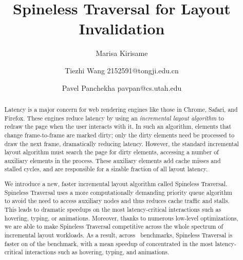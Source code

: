 \documentclass[acmsmall, anonymous, review, screen]{acmart}
\begin{document}
\title[Spineless]{Spineless Traversal for Layout Invalidation}  
\author{Marisa Kirisame}
\author{Tiezhi Wang {2152591@tongji.edu.cn}}
\author{Pavel Panchekha {pavpan@cs.utah.edu}}

\begin{abstract}
Latency is a major concern for web rendering engines
  like those in Chrome, Safari, and Firefox.
These engines reduce latency by using
  an \emph{incremental layout algorithm}
  to redraw the page when
  the user interacts with it.
In such an algorithm,
  elements that change frame-to-frame are marked dirty;
  only the dirty elements need be processed
  to draw the next frame,
  dramatically reducing latency.
However, the standard incremental layout algorithm
  must search the page for dirty elements,
  accessing a number of auxiliary elements
  in the process.
These auxiliary elements
  add cache misses and stalled cycles,
  and are responsible for a sizable fraction
  of all layout latency.

We introduce a new, faster incremental layout algorithm
  called Spineless Traversal.
Spineless Traversal
  uses a more computationally demanding
  priority queue algorithm
  to avoid the need to access auxiliary nodes
  and thus reduces cache traffic and stalls.
This leads to dramatic speedups
  on the most latency-critical interactions
  such as hovering, typing, or animations.
Moreover, thanks to numerous low-level optimizations,
  we are able to make Spineless Traversal
  competitive across the whole spectrum of
  incremental layout workloads.
As a result, across \NumFrames~benchmarks,
  Spineless Traversal is faster on \PctFaster of the benchmark,
  with a mean speedup of \MeanSpeedup
  concentrated in the most latency-critical interactions
  such as hovering, typing, and animations.
\end{abstract}
\end{document}

